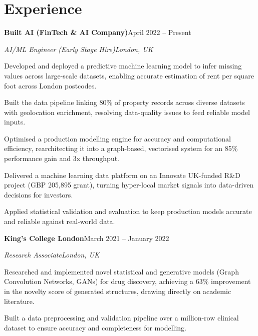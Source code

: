 \documentclass[10pt,a4paper]{article}
\newcommand{\entry}[4]{%
  {\color{company}\bfseries #1}\hfill {\color{muted}#2}\par
  \vspace{1pt}
  {\itshape #3}\hfill {\color{muted}\itshape #4}\par
  \vspace{3pt}%
}
\begin{document}
\section{Experience}
\entry{Built AI (FinTech \& AI Company)}{April 2022 -- Present}{AI/ML Engineer (Early Stage Hire)}{London, UK}
\begin{tight}
  \item Developed and deployed a predictive machine learning model to infer missing values across large-scale datasets, enabling accurate estimation of rent per square foot across London postcodes.
  \item Built the data pipeline linking 80\% of property records across diverse datasets with geolocation enrichment, resolving data-quality issues to feed reliable model inputs.
  \item Optimised a production modelling engine for accuracy and computational efficiency, rearchitecting it into a graph-based, vectorised system for an 85\% performance gain and 3x throughput.
  \item Delivered a machine learning data platform on an Innovate UK-funded R\&D project (GBP 205,895 grant), turning hyper-local market signals into data-driven decisions for investors.
  \item Applied statistical validation and evaluation to keep production models accurate and reliable against real-world data.
\end{tight}

\entry{King's College London}{March 2021 -- January 2022}{Research Associate}{London, UK}
\begin{tight}
  \item Researched and implemented novel statistical and generative models (Graph Convolution Networks, GANs) for drug discovery, achieving a 63\% improvement in the novelty score of generated structures, drawing directly on academic literature.
  \item Built a data preprocessing and validation pipeline over a million-row clinical dataset to ensure accuracy and completeness for modelling.
\end{tight}

\end{document}
